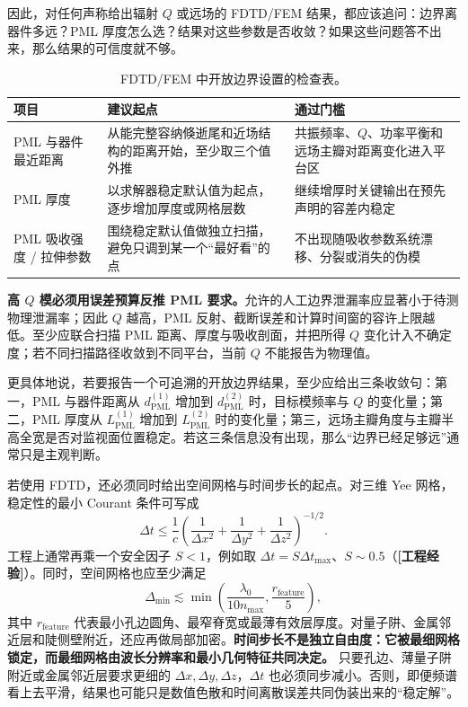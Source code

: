 因此，对任何声称给出辐射 $Q$ 或远场的 FDTD/FEM 结果，都应该追问：边界离器件多远？PML 厚度怎么选？结果对这些参数是否收敛？如果这些问题答不出来，那么结果的可信度就不够。

\begin{table}[htbp]
  \centering
  \footnotesize
  \caption{FDTD/FEM 中开放边界设置的检查表。}
  \label{tab:pml_quantitative_rules}
  \begin{tabularx}{\textwidth}{@{}p{3.0cm}p{4.0cm}Y@{}}
    \toprule
    项目 & 建议起点 & 通过门槛 \\ \midrule
    PML 与器件最近距离 & 从能完整容纳倏逝尾和近场结构的距离开始，至少取三个值外推 & 共振频率、$Q$、功率平衡和远场主瓣对距离变化进入平台区 \\
    PML 厚度 & 以求解器稳定默认值为起点，逐步增加厚度或网格层数 & 继续增厚时关键输出在预先声明的容差内稳定 \\
    PML 吸收强度 / 拉伸参数 & 围绕稳定默认值做独立扫描，避免只调到某一个“最好看”的点 & 不出现随吸收参数系统漂移、分裂或消失的伪模 \\
\end{tabularx}
\end{table}

\begin{warningbox}
\textbf{高 $Q$ 模必须用误差预算反推 PML 要求。}允许的人工边界泄漏率应显著小于待测物理泄漏率；因此 $Q$ 越高，PML 反射、截断误差和计算时间窗的容许上限越低。至少应联合扫描 PML 距离、厚度与吸收剖面，并把所得 $Q$ 变化计入不确定度；若不同扫描路径收敛到不同平台，当前 $Q$ 不能报告为物理值。
\end{warningbox}

更具体地说，若要报告一个可追溯的开放边界结果，至少应给出三条收敛句：第一，PML 与器件距离从 $d_{\mathrm{PML}}^{(1)}$ 增加到 $d_{\mathrm{PML}}^{(2)}$ 时，目标模频率与 $Q$ 的变化量；第二，PML 厚度从 $L_{\mathrm{PML}}^{(1)}$ 增加到 $L_{\mathrm{PML}}^{(2)}$ 时的变化量；第三，远场主瓣角度与主瓣半高全宽是否对监视面位置稳定。若这三条信息没有出现，那么“边界已经足够远”通常只是主观判断。

若使用 FDTD，还必须同时给出空间网格与时间步长的起点。对三维 Yee 网格，稳定性的最小 Courant 条件可写成
\begin{equation}
\Delta t
\le
\frac{1}{c}
\left(
\frac{1}{\Delta x^2}
+
\frac{1}{\Delta y^2}
+
\frac{1}{\Delta z^2}
\right)^{-1/2}.
\label{eq:courant_condition_fdtd}
\end{equation}
工程上通常再乘一个安全因子 $S<1$，例如取 $\Delta t=S\Delta t_{\max}$、$S\sim0.5$（\textbf{[工程经验]}）。同时，空间网格也应至少满足
\[
\Delta_{\min}\lesssim \min\!\left(\frac{\lambda_0}{10n_{\max}},\frac{r_{\mathrm{feature}}}{5}\right),
\]
其中 $r_{\mathrm{feature}}$ 代表最小孔边圆角、最窄脊宽或最薄有效层厚度。对量子阱、金属邻近层和陡侧壁附近，还应再做局部加密。\textbf{时间步长不是独立自由度：它被最细网格锁定，而最细网格由波长分辨率和最小几何特征共同决定。} 只要孔边、薄量子阱附近或金属邻近层要求更细的 $\Delta x,\Delta y,\Delta z$，$\Delta t$ 也必须同步减小。否则，即便频谱看上去平滑，结果也可能只是数值色散和时间离散误差共同伪装出来的“稳定解”。

